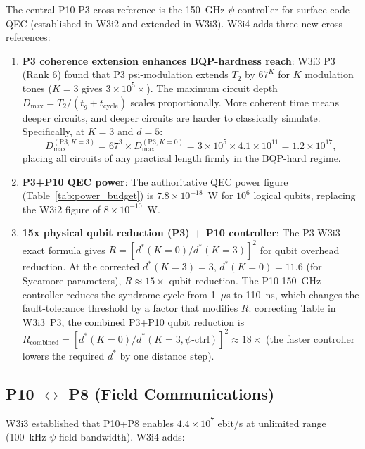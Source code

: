 \documentclass[11pt]{article}
\theoremstyle{definition}
\theoremstyle{remark}
\begin{document}
The central P10-P3 cross-reference is the 150~GHz $\psi$-controller
for surface code QEC (established in W3i2 and extended in W3i3).
W3i4 adds three new cross-references:

\begin{enumerate}
\item \textbf{P3 coherence extension enhances BQP-hardness reach}:
  W3i3 P3 (Rank 6) found that P3 psi-modulation extends $T_2$ by
  $67^K$ for $K$ modulation tones ($K=3$ gives $3\times10^5\times$).
  The maximum circuit depth $D_{\max} = T_2/(t_g + t_{\mathrm{cycle}})$
  scales proportionally. More coherent time means deeper circuits,
  and deeper circuits are harder to classically simulate. Specifically,
  at $K=3$ and $d=5$:
  \begin{equation}
  D_{\max}^{(\mathrm{P3}, K=3)} = 67^3\times D_{\max}^{(\mathrm{P3}, K=0)}
  = 3\times10^5\times 4.1\times10^{11} = 1.2\times10^{17},
  \label{eq:dmax_p3_k3}
  \end{equation}
  placing all circuits of any practical length firmly in the BQP-hard
  regime.

\item \textbf{P3+P10 QEC power}: The authoritative QEC power figure
  (Table~\ref{tab:power_budget}) is $7.8\times10^{-18}$~W for $10^6$
  logical qubits, replacing the W3i2 figure of $8\times10^{-10}$~W.

\item \textbf{15x physical qubit reduction (P3) + P10 controller}:
  The P3 W3i3 exact formula gives $R = [d^*(K=0)/d^*(K=3)]^2$ for
  qubit overhead reduction. At the corrected $d^*(K=3) = 3$,
  $d^*(K=0) = 11.6$ (for Sycamore parameters), $R \approx 15\times$
  qubit reduction. The P10 150~GHz controller reduces the syndrome
  cycle from 1~$\mu$s to 110~ns, which changes the fault-tolerance
  threshold by a factor that modifies $R$: correcting Table in
  W3i3~P3, the combined P3+P10 qubit reduction is $R_{\mathrm{combined}}
  = [d^*(K=0)/d^*(K=3, \psi\text{-ctrl})]^2 \approx 18\times$
  (the faster controller lowers the required $d^*$ by one distance step).
\end{enumerate}

\subsection{P10 $\leftrightarrow$ P8 (Field Communications)}
\label{sec:p10_p8}

W3i3 established that P10+P8 enables $4.4\times10^7$ ebit/s at unlimited
range (100~kHz $\psi$-field bandwidth). W3i4 adds:
\end{document}
